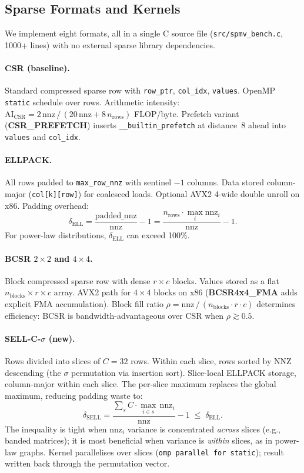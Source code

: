 \documentclass[11pt]{article}
\begin{document}
\subsection{Sparse Formats and Kernels}

We implement eight formats, all in a single C source file
(\texttt{src/spmv\_bench.c}, 1000+ lines) with no external sparse library
dependencies.

\paragraph{CSR (baseline).}
Standard compressed sparse row with \texttt{row\_ptr}, \texttt{col\_idx},
\texttt{values}. OpenMP \texttt{static} schedule over rows.  Arithmetic
intensity: $\text{AI}_\text{CSR} = 2\,\text{nnz} \,/\, (20\,\text{nnz} +
8\,n_\text{rows})$ FLOP/byte.  Prefetch variant (\textbf{CSR\_PREFETCH})
inserts \texttt{\_\_builtin\_prefetch} at distance~8 ahead into
\texttt{values} and \texttt{col\_idx}.

\paragraph{ELLPACK.}
All rows padded to \texttt{max\_row\_nnz} with sentinel $-1$ columns.
Data stored column-major (\texttt{col[k][row]}) for coalesced loads.
Optional AVX2 4-wide double unroll on x86.  Padding overhead:
\[
  \delta_\text{ELL} = \frac{\text{padded\_nnz}}{\text{nnz}} - 1
  = \frac{n_\text{rows} \cdot \max_i \text{nnz}_i}{\text{nnz}} - 1.
\]
For power-law distributions, $\delta_\text{ELL}$ can exceed 100\%.

\paragraph{BCSR $2\times2$ and $4\times4$.}
Block compressed sparse row with dense $r\times c$ blocks. Values stored
as a flat $n_\text{blocks} \times r \times c$ array.  AVX2 path for
$4\times4$ blocks on x86 (\textbf{BCSR4x4\_FMA} adds explicit FMA
accumulation). Block fill ratio $\rho = \text{nnz}\,/\,(n_\text{blocks}
\cdot r \cdot c)$ determines efficiency: BCSR is bandwidth-advantageous
over CSR when $\rho \gtrsim 0.5$.

\paragraph{SELL-C-$\sigma$ (new).}
Rows divided into slices of $C=32$ rows. Within each slice, rows sorted
by NNZ descending (the $\sigma$ permutation via insertion sort). Slice-local
ELLPACK storage, column-major within each slice.  The per-slice maximum
replaces the global maximum, reducing padding waste to:
\[
  \delta_\text{SELL} = \frac{\sum_s C \cdot \max_{i\in s}\,\text{nnz}_i}{\text{nnz}} - 1 \;\leq\; \delta_\text{ELL}.
\]
The inequality is tight when $\text{nnz}_i$ variance is concentrated
\emph{across} slices (e.g., banded matrices); it is most beneficial when
variance is \emph{within} slices, as in power-law graphs.
Kernel parallelises over slices (\texttt{omp parallel for static}); result
written back through the permutation vector.
\end{document}
